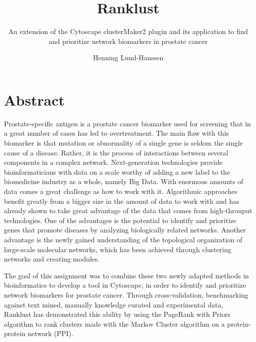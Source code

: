 \documentclass[a4paper,UKenglish]{ifimaster}
\title{Ranklust}
\subtitle{An extension of the Cytoscape clusterMaker2 plugin and its application
to find and prioritize network biomarkers in prostate cancer}
\author{Henning Lund-Hanssen}
\begin{document}
\duoforside[program={Programming and Networks},
    dept={Department of Informatics},long]

\frontmatter{}

\setlength{\parskip}{12pt}
\setlength{\parindent}{12pt}

\chapter*{Abstract}
Prostate-specific antigen is a prostate cancer biomarker used for screening that
in a great number of cases has led to overtreatment. The main flaw with this
biomarker is that mutation or abnormality of a single gene is seldom the single
cause of a disease. Rather, it is the process of interactions between several
components in a complex network. Next-generation technologies provide
bioinformaticians with data on a scale worthy of adding a new label to the
biomedicine industry as a whole, namely Big Data. With enormous amounts of data
comes a great challenge as how to work with it. Algorithmic approaches benefit
greatly from a bigger size in the amount of data to work with and has already
shown to take great advantage of the data that comes from high-throuput
technologies. One of the advantages is the potential to identify and prioritize
genes that promote diseases by analyzing biologically related networks. Another
advantage is the newly gained understanding of the topological organization of
large-scale molecular networks, which has been achieved through clustering
networks and creating modules.

The goal of this assignment was to combine these two
newly adapted methods in bioinformatics to develop a tool in Cytoscape, in order
to identify and prioritize network biomarkers for prostate cancer. Through
cross-validation, benchmarking against text mined, manually knowledge curated
and experimental data, Ranklust has demonstrated this ability by using the
PageRank with Priors algorithm to rank clusters made with the Markov Cluster
algorithm on a protein-protein network (PPI).

\tableofcontents{}
\listoffigures{}
\listoftables{}
\lstlistoflistings
\printglossaries

\mainmatter{}





\backmatter{}
\printbibliography
\end{document}
